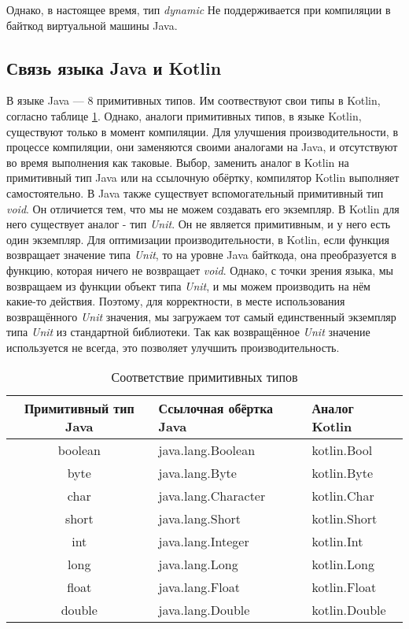 Однако, в настоящее время, тип \textit{dynamic} Не поддерживается при компиляции в байткод виртуальной машины Java.

\subsection{Связь языка Java и Kotlin}
\label{sec:connectKotlinWithJava}
    
В языке Java --- 8 примитивных типов. Им соотвествуют свои типы в Kotlin, согласно таблице \ref{tab:primitiveKotlinVsJava}. Однако, аналоги примитивных типов, в языке Kotlin, существуют только в момент компиляции. Для улучшения производительности, в процессе компиляции, они заменяются своими аналогами на Java, и отсутствуют во время выполнения как таковые. Выбор, заменить аналог в Kotlin на примитивный тип Java или на ссылочную обёртку, компилятор Kotlin выполняет самостоятельно.
В Java также существует вспомогательный примитивный тип \textit{void}. Он отличиется тем, что мы не можем создавать его экземпляр. В Kotlin для него существует аналог - тип \textit{Unit}. Он не является примитивным, и у него есть один экземпляр. Для оптимизации производительности, в Kotlin, если функция возвращает значение типа \textit{Unit}, то на уровне Java байткода, она преобразуется в функцию, которая ничего не возвращает \textit{void}. Однако, с точки зрения языка, мы возвращаем из функции объект типа \textit{Unit}, и мы можем производить на нём какие-то действия. Поэтому, для корректности, в месте использования возвращённого \textit{Unit} значения, мы загружаем тот самый единственный экземпляр типа \textit{Unit} из стандартной библиотеки. Так как возвращённое \textit{Unit} значение используется не всегда, это позволяет улучшить производительность.



\begin{table}[h]
\caption{\label{tab:primitiveKotlinVsJava}Соответствие примитивных типов}
\begin{center}
\begin{tabular}{|c|l|l|}
\hline
Примитивный тип Java & Ссылочная обёртка Java & Аналог Kotlin \\
\hline
boolean  & java.lang.Boolean  & kotlin.Bool  \\
byte  & java.lang.Byte & kotlin.Byte \\
char  & java.lang.Character & kotlin.Char \\
short  & java.lang.Short & kotlin.Short \\
int & java.lang.Integer & kotlin.Int \\
long &  java.lang.Long & kotlin.Long \\
float & java.lang.Float & kotlin.Float \\
double & java.lang.Double & kotlin.Double \\
\hline
\end{tabular}
\end{center}
\end{table}



